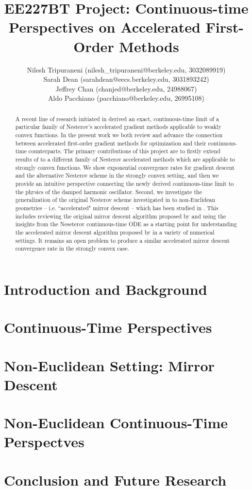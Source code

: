 \documentclass[english]{article}
\title{EE227BT Project:
Continuous-time Perspectives on Accelerated First-Order Methods}
\author{Nilesh Tripuraneni (nilesh\_tripuraneni@berkeley.edu, 3032089919)\\ Sarah Dean (sarahdean@eecs.berkeley.edu, 3031893242)\\ Jeffrey Chan (chanjed@berkeley.edu, 24988067)\\ Aldo Pacchiano (pacchiano@berkeley.edu, 26995108)}
\begin{document}
\maketitle 
\begin{abstract}
   A recent line of research initiated in \citet{su2014differential} derived an exact, continuous-time limit of a particular family of Nesterov's accelerated gradient methods applicable to weakly convex functions. In the present work we both review and advance the connection between accelerated first-order gradient methods for optimization and their continuous-time counterparts.
   The primary contributions of this project are to firstly extend results of \citet{su2014differential} to a different family of Nesterov accelerated methods which are applicable to strongly convex functions. We show exponential convergence rates for gradient descent and the alternative Nesterov scheme in the strongly convex setting, and then we provide an intuitive perspective connecting the newly derived continuous-time limit to the physics of the damped harmonic oscillator. Second, we  
   investigate the generalization of the original Nesterov scheme investigated in \citet{su2014differential} to non-Euclidean geometries -- i.e. ``accelerated" mirror descent -- which has been studied in \citet{krichene2015accelerated}. This includes reviewing the original mirror descent algorithm proposed by \citet{blair1985problem} and using the insights from the Neseterov continuous-time ODE as a starting point for understanding the accelerated mirror descent algorithm proposed by \citet{krichene2015accelerated} in a variety of numerical settings. It remains an open problem to produce a similar accelerated mirror descent convergence rate in the strongly convex case.
\end{abstract}

\newpage
\tableofcontents
\newpage

\section{Introduction and Background}



\section{Continuous-Time Perspectives}



\section{Non-Euclidean Setting: Mirror Descent}



\section{Non-Euclidean Continuous-Time Perspectves}


\section{Conclusion and Future Research}





\end{document}
